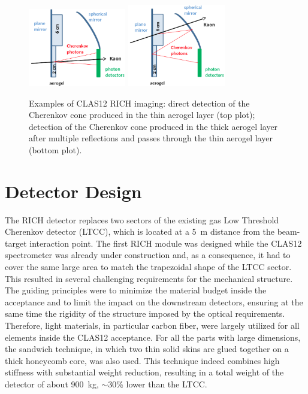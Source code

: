 \documentclass[5p,times,twocolumn]{elsarticle}
\begin{document}
\begin{figure}
\begin{center}
\includegraphics[width=0.38\textwidth]{Layout_direct.png}
\includegraphics[width=0.38\textwidth]{Layout_reflect.png}
\caption{Examples of CLAS12 RICH imaging: direct detection of the Cherenkov cone produced in the thin aerogel layer
  (top plot); detection of the Cherenkov cone produced in the thick aerogel layer after multiple reflections and passes
  through the thin aerogel layer (bottom plot).}
\label{Fig:RICHsketch}
\end{center}
\end{figure}

\section{Detector Design}

The RICH detector replaces two sectors of the existing gas Low Threshold Cherenkov detector (LTCC), which is located
at a 5~m distance from the beam-target interaction point. The first RICH module was designed while the CLAS12 spectrometer was
already under construction and,  as a consequence, it had to cover the same large area to match the trapezoidal shape of
the LTCC sector. This resulted in several challenging requirements for the mechanical structure. The guiding principles
were to minimize the material budget inside the acceptance and to limit the impact on the downstream detectors,
ensuring at the same time the rigidity of the structure imposed by the optical requirements. Therefore, light materials,
in particular carbon fiber, were largely utilized for all elements inside the CLAS12 acceptance. For all the parts with
large dimensions, the sandwich technique, in which two thin solid skins are glued together on a thick honeycomb core, was
also used. This technique indeed combines high stiffness with substantial weight reduction, resulting in a total weight of
the detector of about 900~kg, $\sim$30\% lower than the LTCC.
\end{document}
